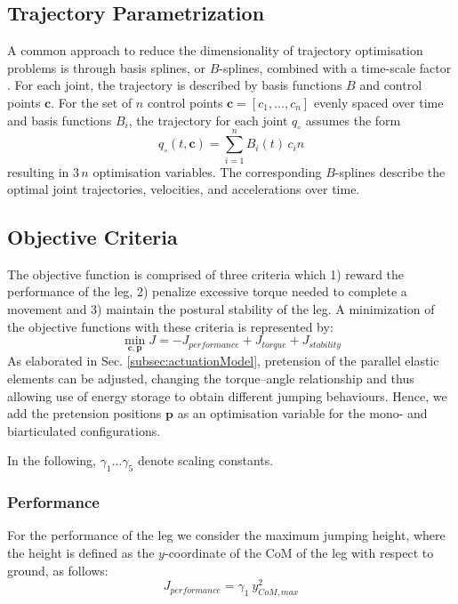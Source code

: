\documentclass[letterpaper, 10 pt, conference]{ieeeconf}  %
\begin{document}
\subsection{Trajectory Parametrization} 
\label{subsec:trajectoryParametrization}
A common approach to reduce the dimensionality of trajectory optimisation problems is through basis splines, or $B$-splines, combined with a time-scale factor \cite{ude2000planning,babivc2009biarticulated,wang1999weight,albro2001optimal}. For each joint, the trajectory is described by basis functions $B$ and control points $\mathbf{c}$. For the set of $n$ control points $\mathbf{c}=\left[c_1,\dots,c_n\right]$ evenly spaced over time and basis functions $B_i$, the trajectory for each joint $q_\circ$ assumes the form
\begin{equation}
	q_\circ(t,\mathbf{c}) = \sum_{i=1}^{n} B_i (t) \, c_in
\end{equation}
resulting in $3 \, n$ optimisation variables. The corresponding $B$-splines describe the optimal joint trajectories, velocities, and accelerations over time.

\subsection{Objective Criteria} 
\label{subsec:objectiveCriteria}
The objective function is comprised of three criteria which 1) reward the performance of the leg, 2) penalize excessive torque needed to complete a movement and 3) maintain the postural stability of the leg. A minimization of the objective functions with these criteria is represented by:
\begin{equation}
	\min_{\mathbf{c}, \mathbf{p}} J = -J_{performance} + J_{torque} + J_{stability}
\end{equation}
As elaborated in Sec. \ref{subsec:actuationModel}, pretension of the parallel elastic elements can be adjusted, changing the torque--angle relationship and thus allowing use of energy storage to obtain different jumping behaviours. Hence, we add the pretension positions $\mathbf{p}$ as an optimisation variable for the mono- and biarticulated configurations.

In the following, $\gamma_1 \dots \gamma_5$ denote scaling constants.

\subsubsection{Performance}
For the performance of the leg we consider the maximum jumping height, where the height is defined as the $y$-coordinate of the CoM of the leg with respect to ground, as follows:
\begin{equation}
	J_{performance} = \gamma_1 \: y_{CoM,max}^2
\end{equation}
\end{document}
